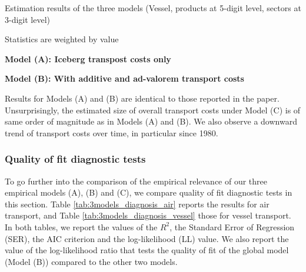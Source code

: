 \documentclass[11pt,twoside, authoryear]{elsarticle}
\begin{document}
\begin{table}[htbp]
	\centering
	\footnotesize{
		\caption{Estimation results of the three models (Vessel, products at 5-digit level, sectors at 3-digit level)}
		\label{tab:3models_estimation_results_ves}%
		
		\begin{tablenotes}
			\tiny
		\item Statistics are weighted by value
		\item \textbf{Model (A): Iceberg transpost costs only}
		\item \textbf{Model (B): With additive and ad-valorem transport costs}
		\end{tablenotes}
   }
\end{table}%

Results for Models (A) and (B) are identical to those reported in the paper. Unsurprisingly, the estimated size of overall transport costs under Model (C) is of same order of magnitude as in Models (A) and (B). We also observe a downward trend of transport costs over time, in particular since 1980.\\



\subsubsection{Quality of fit diagnostic tests}

To go further into the comparison of the empirical relevance of our three empirical models (A), (B) and (C), we compare quality of fit diagnostic tests in this section. Table \ref{tab:3models_diagnosis_air} reports the results for air transport, and Table \ref{tab:3models_diagnosis_vessel} those for vessel transport. In both tables, we report the values of the $R^2$, the Standard Error of Regression (SER), the AIC criterion  and the log-likelihood (LL) value. We also report the value of the log-likelihood ratio that tests the quality of fit of the global model (Model (B)) compared to the other two models.
\end{document}
